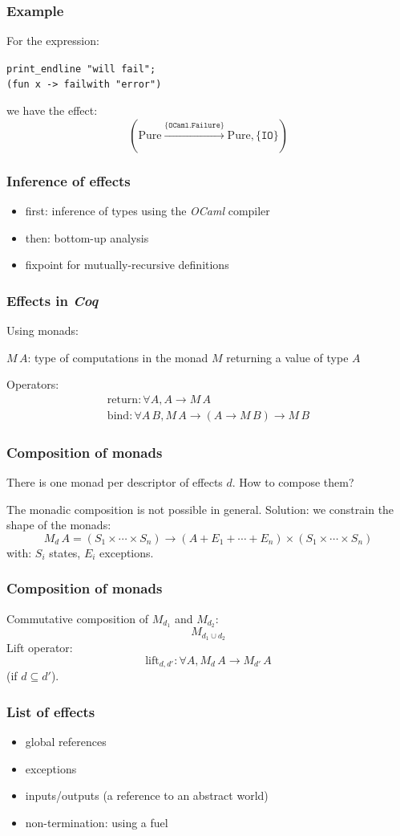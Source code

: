 \documentclass[hyperref={pdfpagelabels=false}]{beamer}
\begin{document}
  \begin{frame}
    \frametitle{Example}
    For the expression:

    \texttt{print\_endline "will fail";\\(fun x -> failwith "error")}

    we have the effect:
    \[
      (\mathrm{Pure} \xrightarrow{\{\mathtt{OCaml.Failure}\}} \mathrm{Pure}, \{\mathtt{IO}\})
    \]
  \end{frame}
  \begin{frame}
    \frametitle{Inference of effects}
    \begin{itemize}
      \item first: inference of types using the \emph{OCaml} compiler
      \item then: bottom-up analysis
      \item fixpoint for mutually-recursive definitions
    \end{itemize}
  \end{frame}
  \begin{frame}
    \frametitle{Effects in \emph{Coq}}
    Using monads:
    \begin{center}
      $M\,A$: type of computations in the monad $M$ returning a value of type $A$
    \end{center}
    Operators:
    \[
      \begin{array}{l}
      \mathrm{return} : \forall A, A \rightarrow M\,A\\
      \mathrm{bind} : \forall A\,B, M\,A \rightarrow (A \rightarrow M\,B) \rightarrow M\,B
      \end{array}
    \]
  \end{frame}
  \begin{frame}
    \frametitle{Composition of monads}
    There is one monad per descriptor of effects $d$. How to compose them?

    The monadic composition is not possible in general. Solution: we constrain the shape of the monads:
    \[
      M_d\,A = (S_1 \times \cdots \times S_n) \rightarrow (A + E_1 + \cdots + E_n) \times (S_1 \times \cdots \times S_n)
    \]
    with: $S_i$ states, $E_i$ exceptions.
  \end{frame}
  \begin{frame}
    \frametitle{Composition of monads}
    Commutative composition of $M_{d_1}$ and $M_{d_2}$:
    \[
      M_{d_1 \cup d_2}
    \]
    Lift operator:
    \[
      \mathrm{lift}_{d, d'} : \forall A, M_d\,A \rightarrow M_{d'}\,A
    \]
    (if $d \subseteq d'$).
  \end{frame}
  \begin{frame}
    \frametitle{List of effects}
    \begin{itemize}
      \item global references
      \item exceptions
      \item inputs/outputs (a reference to an abstract world)
      \item non-termination: using a fuel
    \end{itemize}
  \end{frame}
\end{document}
